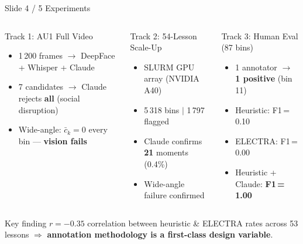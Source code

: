 \documentclass[aspectratio=169,10pt]{beamer}
\newcommand{\hl}[1]{\textcolor{myteal}{\textbf{#1}}}
\begin{document}
\begin{frame}{Slide 4 / 5 \quad Experiments}
\begin{columns}[T]
\begin{block}{\small Track 1: AU1 Full Video}
\begin{itemize}\footnotesize
  \item 1\,200 frames $\to$ DeepFace + Whisper + Claude
  \item 7 candidates $\to$ Claude rejects \textbf{all} (social disruption)
  \item Wide-angle: $\bar{c}_k{=}0$ every bin --- \textbf{vision fails}
\end{itemize}
\end{block}
\begin{block}{\small Track 2: 54-Lesson Scale-Up}
\begin{itemize}\footnotesize
  \item SLURM GPU array (NVIDIA A40)
  \item 5\,318 bins $|$ 1\,797 flagged
  \item Claude confirms \textbf{21} moments (0.4\%)
  \item Wide-angle failure confirmed
\end{itemize}
\end{block}
\begin{block}{\small Track 3: Human Eval (87 bins)}
\begin{itemize}\footnotesize
  \item 1 annotator $\to$ \textbf{1 positive} (bin\,11)
  \item Heuristic: F1\,=\,0.10
  \item ELECTRA: F1\,=\,0.00
  \item Heuristic + Claude: \hl{F1\,=\,1.00}
\end{itemize}
\end{block}
\end{columns}
\bigskip
\begin{alertblock}{Key finding}
$r{=}{-}0.35$ correlation between heuristic \& ELECTRA rates across
53 lessons $\Rightarrow$ \textbf{annotation methodology is a first-class design variable}.
\end{alertblock}
\end{frame}
\end{document}
